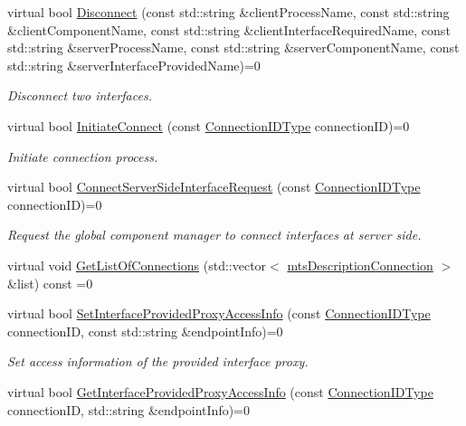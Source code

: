 \begin{DoxyCompactItemize}
virtual bool \hyperlink{classmts_manager_global_interface_a634c44151f8ef120526bc2be0cc3eb9a}{Disconnect} (const std\-::string \&client\-Process\-Name, const std\-::string \&client\-Component\-Name, const std\-::string \&client\-Interface\-Required\-Name, const std\-::string \&server\-Process\-Name, const std\-::string \&server\-Component\-Name, const std\-::string \&server\-Interface\-Provided\-Name)=0
\begin{DoxyCompactList}\small\item\em Disconnect two interfaces. \end{DoxyCompactList}\item 
virtual bool \hyperlink{classmts_manager_global_interface_aa9e2d02acd143d1a3ec7b7cc50c394ef}{Initiate\-Connect} (const \hyperlink{mts_forward_declarations_8h_ad3543bb11742e1766374ec96016d6547}{Connection\-I\-D\-Type} connection\-I\-D)=0
\begin{DoxyCompactList}\small\item\em Initiate connection process. \end{DoxyCompactList}\item 
virtual bool \hyperlink{classmts_manager_global_interface_a997fe786b674ece0eaf077040f170e08}{Connect\-Server\-Side\-Interface\-Request} (const \hyperlink{mts_forward_declarations_8h_ad3543bb11742e1766374ec96016d6547}{Connection\-I\-D\-Type} connection\-I\-D)=0
\begin{DoxyCompactList}\small\item\em Request the global component manager to connect interfaces at server side. \end{DoxyCompactList}\item 
virtual void \hyperlink{classmts_manager_global_interface_a95665a4a3b83ac9ca2e0e883832f657c}{Get\-List\-Of\-Connections} (std\-::vector$<$ \hyperlink{classmts_description_connection}{mts\-Description\-Connection} $>$ \&list) const =0
\item 
virtual bool \hyperlink{classmts_manager_global_interface_a40dab0f138d6305055bda1ce2f852f6e}{Set\-Interface\-Provided\-Proxy\-Access\-Info} (const \hyperlink{mts_forward_declarations_8h_ad3543bb11742e1766374ec96016d6547}{Connection\-I\-D\-Type} connection\-I\-D, const std\-::string \&endpoint\-Info)=0
\begin{DoxyCompactList}\small\item\em Set access information of the provided interface proxy. \end{DoxyCompactList}\item 
virtual bool \hyperlink{classmts_manager_global_interface_ade5d23408244c8bbecec7809419676c6}{Get\-Interface\-Provided\-Proxy\-Access\-Info} (const \hyperlink{mts_forward_declarations_8h_ad3543bb11742e1766374ec96016d6547}{Connection\-I\-D\-Type} connection\-I\-D, std\-::string \&endpoint\-Info)=0

\end{DoxyCompactItemize}
